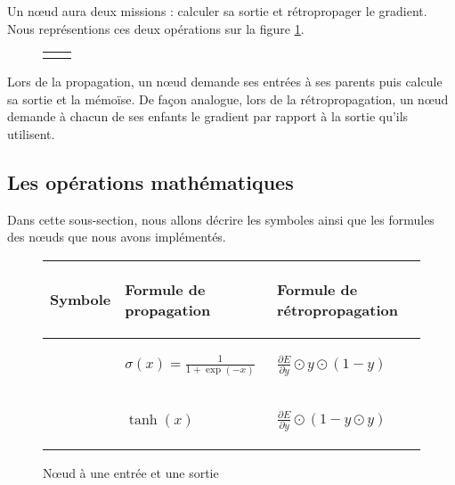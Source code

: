 Un n\oe{}ud aura deux missions : calculer sa sortie et rétropropager le gradient. Nous représentions ces deux opérations sur la figure \ref{node}.

\begin{figure}
\begin{center}
\begin{tabular}{cc}
 &  \\
\end{tabular}
\end{center}
\label{node}
\end{figure}

Lors de la propagation, un n\oe{}ud demande ses entrées à ses parents puis calcule sa sortie et la mémoïse. De façon analogue, lors de la rétropropagation, un n\oe{}ud demande à chacun de ses enfants le gradient par rapport à la sortie qu'ils utilisent.

\subsection{Les opérations mathématiques}

Dans cette sous-section, nous allons décrire les symboles ainsi que les formules des n\oe{}uds que nous avons implémentés.

\begin{figure}[h!]
\begin{center}
\begin{tabular}{|m{4cm}|m{}|m{}|}
\hline
\begin{center}Symbole\end{center} & \begin{center}Formule de propagation\end{center} & \begin{center}Formule de rétropropagation\end{center} \\
\hline
\begin{center}\end{center} & \begin{center}$\sigma(x) = \frac{1}{1 + \exp(-x)}$\end{center} & \begin{center}$\frac{\partial E}{\partial y} \odot y \odot (1 - y)$\end{center} \\
\hline
\begin{center}\end{center} & \begin{center}$\tanh(x)$\end{center} & \begin{center}$\frac{\partial E}{\partial y} \odot (1 - y \odot y)$\end{center} \\ 
\hline
\end{tabular}
\end{center}
\caption{N\oe{}ud à une entrée et une sortie}
\end{figure}

